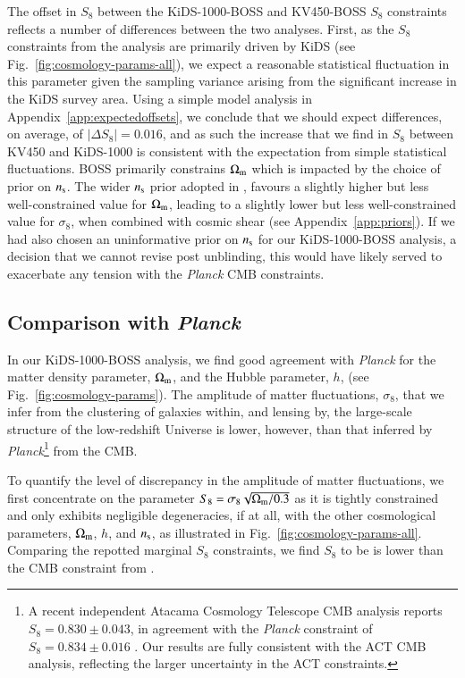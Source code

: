 The offset in $S_8$ between the KiDS-1000-BOSS and KV450-BOSS $S_8$ constraints reflects a number of differences between the two analyses.  First, as the $S_8$ constraints from the \tttp analysis are primarily driven by KiDS (see Fig.~\ref{fig:cosmology-params-all}), we expect a reasonable statistical fluctuation in this parameter given the sampling variance arising from the significant increase in the KiDS survey area.  Using a simple model analysis in Appendix~\ref{app:expectedoffsets}, we conclude that we should expect differences, on average, of $|\Delta S_8| = 0.016$, and as such the increase that we find in $S_8$ between KV450 and KiDS-1000 is consistent with the expectation from simple statistical fluctuations.   BOSS primarily constrains $\Omega_{\rm m}$ which is impacted by the choice of prior on $n_{\rm s}$.  The wider $n_{\rm s}$ prior adopted in \citet{troester/etal:2020}, favours a slightly higher but less well-constrained value for $\Omega_{\rm m}$, leading to a slightly lower but less well-constrained value for $\sigma_8$, when combined with cosmic shear (see Appendix~\ref{app:priors}).   If we had also chosen an uninformative prior on $n_{\rm s}$ for our KiDS-1000-BOSS analysis, a decision that we cannot revise post unblinding, this would have likely served to exacerbate any tension with the {\it Planck} CMB constraints.   



\subsection{Comparison with {\it Planck}}
\label{sec:planck_comp}
In our KiDS-1000-BOSS \tttp analysis, we find good agreement with {\it Planck} for the matter density parameter, $\Omega_{\rm m}$, and the Hubble parameter, $h$, (see Fig.~\ref{fig:cosmology-params}).
The amplitude of matter fluctuations, $\sigma_8$, that we infer from the clustering of galaxies within, and lensing by, the large-scale structure of the low-redshift Universe is lower, however, than that inferred by {\it Planck}\footnote{A recent independent Atacama Cosmology Telescope CMB analysis reports $S_8=0.830 \pm 0.043$, in agreement with the {\it Planck} constraint of $S_8=0.834 \pm 0.016$ \citep[ACT,][]{aiola/etal:2020}.   Our results are fully consistent with the ACT CMB analysis, reflecting the larger uncertainty in the ACT constraints.} from the CMB. 

To quantify the level of discrepancy in the amplitude of matter fluctuations, we first concentrate on the parameter $S_{8} = \sigma_8 \sqrt{\Omega_{\rm m}/0.3}$ as it is tightly constrained and only exhibits negligible degeneracies, if at all, with the other cosmological parameters, $\Omega_{\rm m}$, $h$, and $n_{\rm s}$, as illustrated in Fig.~\ref{fig:cosmology-params-all}.   Comparing the repotted marginal $S_8$ constraints, we find $S_8$ to be is \kpoffperc lower than the CMB constraint from \citet{planck/etal:2018}.

